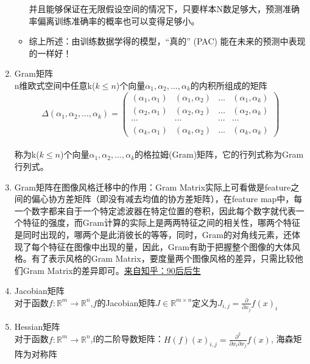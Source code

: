 \documentclass[UTF8]{article}%
\begin{document}
\begin{enumerate}
\begin{itemize}
$$				$$
				并且能够保证在无限假设空间的情况下，只要样本N数足够大，预测准确率偏离训练准确率的概率也可以变得足够小。
				\item 综上所述：由训练数据学得的模型，“真的” (PAC) 能在未来的预测中表现的一样好！
			\end{itemize}
			\color{red}
			\item Gram矩阵
			\color{black}
			\\n维欧式空间中任意k($k \leq n$)个向量$\alpha_1,\alpha_2,...,\alpha_k$的内积所组成的矩阵
			$$
			\Delta\left(\alpha_{1}, \alpha_{2}, \ldots, \alpha_{k}\right)=\left( \begin{array}{cccc}{\left(\alpha_{1}, \alpha_{1}\right)} & {\left(\alpha_{1}, \alpha_{2}\right)} & {\dots} & {\left(\alpha_{1}, \alpha_{k}\right)} \\ {\left(\alpha_{2}, \alpha_{1}\right)} & {\left(\alpha_{2}, \alpha_{2}\right)} & {\dots} & {\left(\alpha_{2}, \alpha_{k}\right)} \\ {\cdots} & {\cdots} & {\cdots} & {\cdots} \\ {\left(\alpha_{k}, \alpha_{1}\right)} & {\left(\alpha_{k}, \alpha_{2}\right)} & {\dots} & {\left(\alpha_{k}, \alpha_{k}\right)}\end{array}\right)
			$$
			\\称为k($k \leq n$)个向量$\alpha_1,\alpha_2,...,\alpha_k$的格拉姆(Gram)矩阵，它的行列式称为Gram行列式。
			\item Gram矩阵在图像风格迁移中的作用：Gram Matrix实际上可看做是feature之间的偏心协方差矩阵（即没有减去均值的协方差矩阵），在feature map中，每一个数字都来自于一个特定滤波器在特定位置的卷积，因此每个数字就代表一个特征的强度，而Gram计算的实际上是两两特征之间的相关性，哪两个特征是同时出现的，哪两个是此消彼长的等等，同时，Gram的对角线元素，还体现了每个特征在图像中出现的量，因此，Gram有助于把握整个图像的大体风格。有了表示风格的Gram Matrix，要度量两个图像风格的差异，只需比较他们Gram Matrix的差异即可。\href{https://www.zhihu.com/question/49805962/answer/199427278}{来自知乎：90后后生}
			\color{red}
			\item Jacobian矩阵
			\color{black}
			\\对于函数$f:\mathbb{R}^m \rightarrow \mathbb{R}^n$,$f$的Jacobian矩阵$J \in \mathbb{R}^{m \times n} $定义为$J_{i,j}=\frac{\partial}{\partial{x_j}}f(x)_i$
			\color{red}
			\item Hessian矩阵
			\color{black}
			\\对于函数$f:\mathbb{R}^m \rightarrow \mathbb{R}^n$,f的二阶导数矩阵：$H(f)(x)_{i,j}=\frac{\partial^2}{\partial{x_i}\partial{x_j}}f(x)$, 海森矩阵为对称阵

\end{enumerate}
\end{document}
